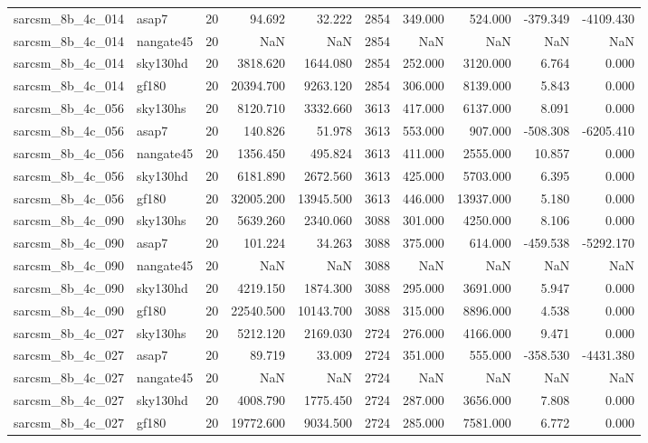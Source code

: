 \begin{longtable}{llrrrrrrrr}
sarcsm\_8b\_4c\_014 & asap7 & 20 & 94.692 & 32.222 & 2854 & 349.000 & 524.000 & -379.349 & -4109.430 \\
sarcsm\_8b\_4c\_014 & nangate45 & 20 & NaN & NaN & 2854 & NaN & NaN & NaN & NaN \\
sarcsm\_8b\_4c\_014 & sky130hd & 20 & 3818.620 & 1644.080 & 2854 & 252.000 & 3120.000 & 6.764 & 0.000 \\
sarcsm\_8b\_4c\_014 & gf180 & 20 & 20394.700 & 9263.120 & 2854 & 306.000 & 8139.000 & 5.843 & 0.000 \\
sarcsm\_8b\_4c\_056 & sky130hs & 20 & 8120.710 & 3332.660 & 3613 & 417.000 & 6137.000 & 8.091 & 0.000 \\
sarcsm\_8b\_4c\_056 & asap7 & 20 & 140.826 & 51.978 & 3613 & 553.000 & 907.000 & -508.308 & -6205.410 \\
sarcsm\_8b\_4c\_056 & nangate45 & 20 & 1356.450 & 495.824 & 3613 & 411.000 & 2555.000 & 10.857 & 0.000 \\
sarcsm\_8b\_4c\_056 & sky130hd & 20 & 6181.890 & 2672.560 & 3613 & 425.000 & 5703.000 & 6.395 & 0.000 \\
sarcsm\_8b\_4c\_056 & gf180 & 20 & 32005.200 & 13945.500 & 3613 & 446.000 & 13937.000 & 5.180 & 0.000 \\
sarcsm\_8b\_4c\_090 & sky130hs & 20 & 5639.260 & 2340.060 & 3088 & 301.000 & 4250.000 & 8.106 & 0.000 \\
sarcsm\_8b\_4c\_090 & asap7 & 20 & 101.224 & 34.263 & 3088 & 375.000 & 614.000 & -459.538 & -5292.170 \\
sarcsm\_8b\_4c\_090 & nangate45 & 20 & NaN & NaN & 3088 & NaN & NaN & NaN & NaN \\
sarcsm\_8b\_4c\_090 & sky130hd & 20 & 4219.150 & 1874.300 & 3088 & 295.000 & 3691.000 & 5.947 & 0.000 \\
sarcsm\_8b\_4c\_090 & gf180 & 20 & 22540.500 & 10143.700 & 3088 & 315.000 & 8896.000 & 4.538 & 0.000 \\
sarcsm\_8b\_4c\_027 & sky130hs & 20 & 5212.120 & 2169.030 & 2724 & 276.000 & 4166.000 & 9.471 & 0.000 \\
sarcsm\_8b\_4c\_027 & asap7 & 20 & 89.719 & 33.009 & 2724 & 351.000 & 555.000 & -358.530 & -4431.380 \\
sarcsm\_8b\_4c\_027 & nangate45 & 20 & NaN & NaN & 2724 & NaN & NaN & NaN & NaN \\
sarcsm\_8b\_4c\_027 & sky130hd & 20 & 4008.790 & 1775.450 & 2724 & 287.000 & 3656.000 & 7.808 & 0.000 \\
sarcsm\_8b\_4c\_027 & gf180 & 20 & 19772.600 & 9034.500 & 2724 & 285.000 & 7581.000 & 6.772 & 0.000 \\

\end{longtable}
